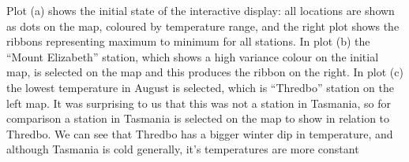 \documentclass[
  shortnames]{jss}
\newenvironment{Shaded}{\begin{snugshade}}{\end{snugshade}}
\newcommand{\AttributeTok}[1]{\textcolor[rgb]{0.77,0.63,0.00}{#1}}
\newcommand{\FunctionTok}[1]{\textcolor[rgb]{0.00,0.00,0.00}{#1}}
\newcommand{\NormalTok}[1]{#1}
\newcommand{\OtherTok}[1]{\textcolor[rgb]{0.56,0.35,0.01}{#1}}
\newcommand{\SpecialCharTok}[1]{\textcolor[rgb]{0.00,0.00,0.00}{#1}}
\newcommand{\StringTok}[1]{\textcolor[rgb]{0.31,0.60,0.02}{#1}}
\begin{document}
\begin{Shaded}
\end{Shaded}

Plot (a) shows the initial state of the interactive display: all locations are shown as dots on the map, coloured by temperature range, and the right plot shows the ribbons representing maximum to minimum for all stations. In plot (b) the ``Mount Elizabeth'' station, which shows a high variance colour on the initial map, is selected on the map and this produces the ribbon on the right. In plot (c) the lowest temperature in August is selected, which is ``Thredbo'' station on the left map. It was surprising to us that this was not a station in Tasmania, so for comparison a station in Tasmania is selected on the map to show in relation to Thredbo. We can see that Thredbo has a bigger winter dip in temperature, and although Tasmania is cold generally, it's temperatures are more constant
\end{document}
